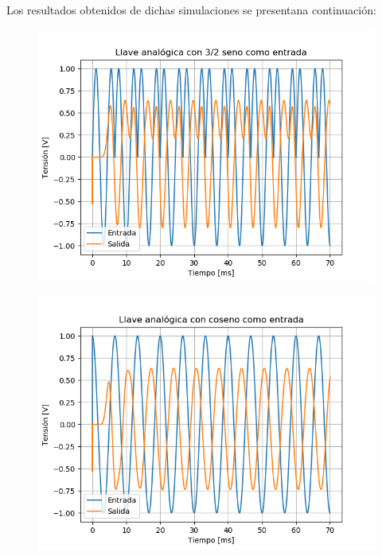 Los resultados obtenidos de dichas simulaciones se presentana continuación:
\begin{multicols}{2}
\begin{figure}[H]
	\centering
	\includegraphics[width=\linewidth]{ImagenesEjercicio6/LA - 3 2.png}
\end{figure}
\begin{figure}[H]
	\centering
	\includegraphics[width=\linewidth]{ImagenesEjercicio6/LA - Cos.png}
\end{figure}
\begin{figure}[H]
	\centering

\end{figure}
\end{multicols}
